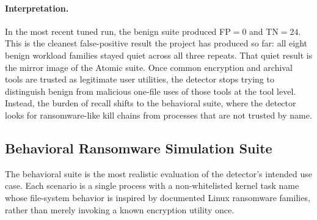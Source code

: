 \documentclass[twocolumn, 10pt]{scrartcl}
\begin{document}
\paragraph{Interpretation.}
In the most recent tuned run, the benign suite produced FP$=0$ and TN$=24$. This is the cleanest false-positive result the project has produced so far: all eight benign workload families stayed quiet across all three repeats. That quiet result is the mirror image of the Atomic suite. Once common encryption and archival tools are trusted as legitimate user utilities, the detector stops trying to distinguish benign from malicious one-file uses of those tools at the tool level. Instead, the burden of recall shifts to the behavioral suite, where the detector looks for ransomware-like kill chains from processes that are not trusted by name.
\subsection{Behavioral Ransomware Simulation Suite}
The behavioral suite is the most realistic evaluation of the detector's intended use case. Each scenario is a single process with a non-whitelisted kernel task name whose file-system behavior is inspired by documented Linux ransomware families, rather than merely invoking a known encryption utility once.
\end{document}
